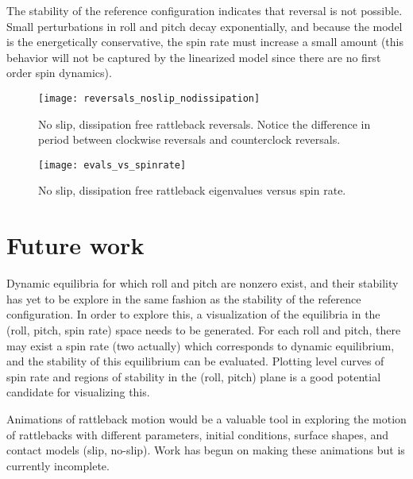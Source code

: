 \documentclass[letterpaper,11pt]{article}
\begin{document}
  The stability of the reference configuration indicates that reversal is not
  possible.  Small perturbations in roll and pitch decay exponentially, and
  because the model is the energetically conservative, the spin rate must
  increase a small amount (this behavior will not be captured by the linearized
  model since there are no first order spin dynamics).

  \begin{figure}
    \centering
    \texttt{[image: reversals\_noslip\_nodissipation]}
    \caption{No slip, dissipation free rattleback reversals.  Notice the
    difference in period between clockwise reversals and counterclock
  reversals.}
  \end{figure}

  \begin{figure}
    \centering
    \texttt{[image: evals\_vs\_spinrate]}
    \caption{No slip, dissipation free rattleback eigenvalues versus spin rate.}
  \end{figure}

  \section{Future work}
  Dynamic equilibria for which roll and pitch are nonzero exist, and their
  stability has yet to be explore in the same fashion as the stability of the
  reference configuration.  In order to explore this, a visualization of the
  equilibria in the (roll, pitch, spin rate) space needs to be generated.  For
  each roll and pitch, there may exist a spin rate (two actually) which
  corresponds to dynamic equilibrium, and the stability of this equilibrium can
  be evaluated.  Plotting level curves of spin rate and regions of stability in
  the (roll, pitch) plane is a good potential candidate for visualizing this.

  Animations of rattleback motion would be a valuable tool in exploring the
  motion of rattlebacks with different parameters, initial conditions, surface
  shapes, and contact models (slip, no-slip).  Work has begun on making these
  animations but is currently incomplete.



\end{document}
